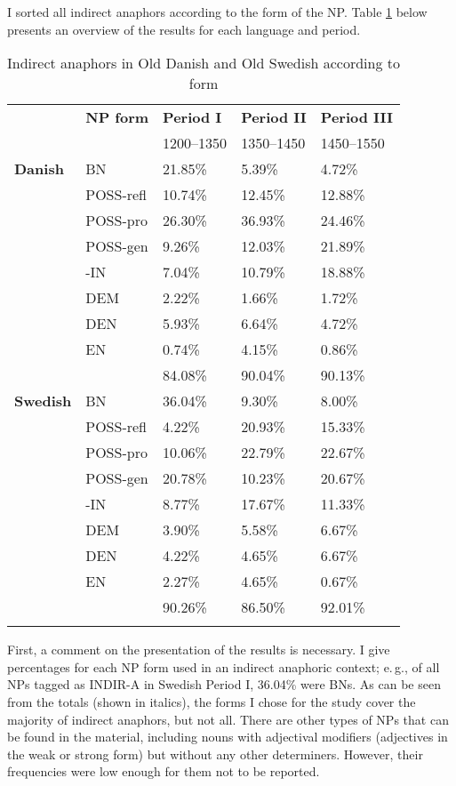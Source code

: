 \documentclass[output=paper]{langsci/langscibook}
\begin{document}
I sorted all indirect anaphors according to the form of the NP. Table \ref{6table:3} below presents an overview of the results for each language and period. 

\begin{table}[H]
\centering
\begin{tabular}{m{55pt}m{55pt}m{55pt}m{55pt}m{55pt}}
\lsptoprule
  & {\textbf{NP form}} & {\textbf{Period I}} & {\textbf{Period II}} & {\textbf{Period III}} \\
  &   & 1200--1350 & 1350--1450 & 1450--1550 \\
\midrule
{\textbf{Danish}} & BN		& 21.85\%		& 5.39\%		& 4.72\%	\\ 
 & POSS-refl	& 10.74\%		& 12.45\%		& 12.88\% \\ 
 & POSS-pro	& 26.30\%		& 36.93\%		& 24.46\% \\ 
 & POSS-gen	& 9.26\%		& 12.03\%		& 21.89\% \\ 
 & -IN		& 7.04\%		& 10.79\%		& 18.88\% \\ 
 & DEM		& 2.22\%		& 1.66\%		& 1.72\% \\ 
 & DEN		& 5.93\%		& 6.64\%		& 4.72\% \\ 
 & EN		& 0.74\%		& 4.15\%		& 0.86\% \\ 
 \cmidrule{3-5}
 & 			& 84.08\% 	& 90.04\%		& 90.13\% \\ 
\midrule
{\textbf{Swedish}} & BN & 36.04\%	& 9.30\%	& 8.00\% \\ 
 & POSS-refl	& 4.22\%		& 20.93\%		& 15.33\% \\ 
 & POSS-pro	& 10.06\%		& 22.79\%		& 22.67\% \\ 
 & POSS-gen	& 20.78\%		& 10.23\%		& 20.67\% \\ 
 & -IN		& 8.77\%		& 17.67\%		& 11.33\% \\ 
 & DEM		& 3.90\%		& 5.58\%		& 6.67\% \\ 
 & DEN		& 4.22\%		& 4.65\%		& 6.67\% \\ 
 & EN		& 2.27\%		& 4.65\%		& 0.67\% \\ 
  \cmidrule{3-5}
 & 			& 90.26\%	 	& 86.50\% 	& 92.01\% \\
\lspbottomrule
\end{tabular}
\caption{Indirect anaphors in Old Danish and Old Swedish according to form}\label{6table:3}
\end{table}

First, a comment on the presentation of the results is necessary. I give percentages for each NP form used in an indirect anaphoric context; e.\,g., of all NPs tagged as INDIR-A in Swedish Period I, 36.04\% were BNs. As can be seen from the totals (shown in italics), the forms I chose for the study cover the majority of indirect anaphors, but not all. There are other types of NPs that can be found in the material, including nouns with adjectival modifiers (adjectives in the weak or strong form) but without any other determiners. However, their frequencies were low enough for them not to be reported. 
\end{document}
